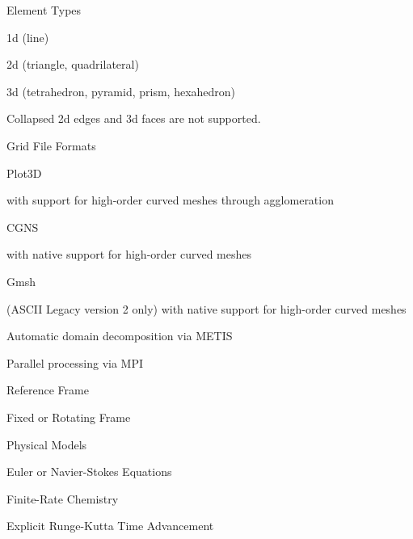 \begin{overview}
\item Element Types
  \begin{overview}
  \item 1d (line)
  \item 2d (triangle, quadrilateral)
  \item 3d (tetrahedron, pyramid, prism, hexahedron)
  \item Collapsed 2d edges and 3d faces are not supported.
  \end{overview}
\item Grid File Formats
  \begin{overview}
    \item Plot3D
    \begin{overview}
      \item with support for high-order curved meshes through agglomeration
    \end{overview}
    \item CGNS
    \begin{overview}
      \item with native support for high-order curved meshes
    \end{overview}
    \item Gmsh
    \begin{overview}
      \item (ASCII Legacy version 2 only) with native support for high-order
        curved meshes
    \end{overview}
  \end{overview}
\item Automatic domain decomposition via METIS
\item Parallel processing via MPI
\item Reference Frame
  \begin{overview}
  \item Fixed or Rotating Frame
  \end{overview}
\item Physical Models
  \begin{overview}
  \item Euler or Navier-Stokes Equations
  \item Finite-Rate Chemistry
  \end{overview}
\item Explicit Runge-Kutta Time Advancement
  \begin{overview}

\end{overview}
\end{overview}
